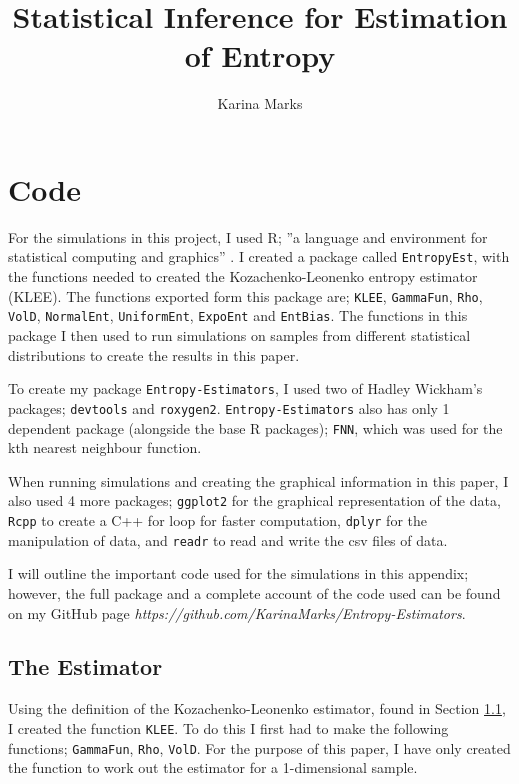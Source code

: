 \documentclass{report}
\title{Statistical Inference for Estimation of Entropy}
\author{Karina Marks}
\begin{document}
\lstset{showstringspaces=false, breaklines=true}

\chapter{Code}

For the simulations in this project, I used R; ''a language and environment for statistical computing and graphics'' \cite{code1}. I created a package called \texttt{EntropyEst}, with the functions needed to created the Kozachenko-Leonenko entropy estimator (KLEE). The functions exported form this package are; \texttt{KLEE}, \texttt{GammaFun}, \texttt{Rho}, \texttt{VolD}, \texttt{NormalEnt}, \texttt{UniformEnt}, \texttt{ExpoEnt} and \texttt{EntBias}. The functions in this package I then used to run simulations on samples from different statistical distributions to create the results in this paper.

To create my package \texttt{Entropy-Estimators}, I used two of Hadley Wickham's \cite{code2} packages; \texttt{devtools} and \texttt{roxygen2}. \texttt{Entropy-Estimators} also has only 1 dependent package (alongside the base R packages); \texttt{FNN}, which was used for the kth nearest neighbour function. 

When running simulations and creating the graphical information in this paper, I also used 4 more packages;  \texttt{ggplot2} for the graphical representation of the data, \texttt{Rcpp} to create a C++ for loop for faster computation, \texttt{dplyr} for the manipulation of data, and \texttt{readr} to read and write the csv files of data.

I will outline the important code used for the simulations in this appendix; however, the full package and a complete account of the code used can be found on my GitHub page \textit{https://github.com/KarinaMarks/Entropy-Estimators}.

\section{The Estimator}

Using the definition of the Kozachenko-Leonenko estimator, found in Section \ref{}, I created the function \texttt{KLEE}. To do this I first had to make the following functions; \texttt{GammaFun}, \texttt{Rho}, \texttt{VolD}. For the purpose of this paper, I have only created the function to work out the estimator for a 1-dimensional sample.
\end{document}
